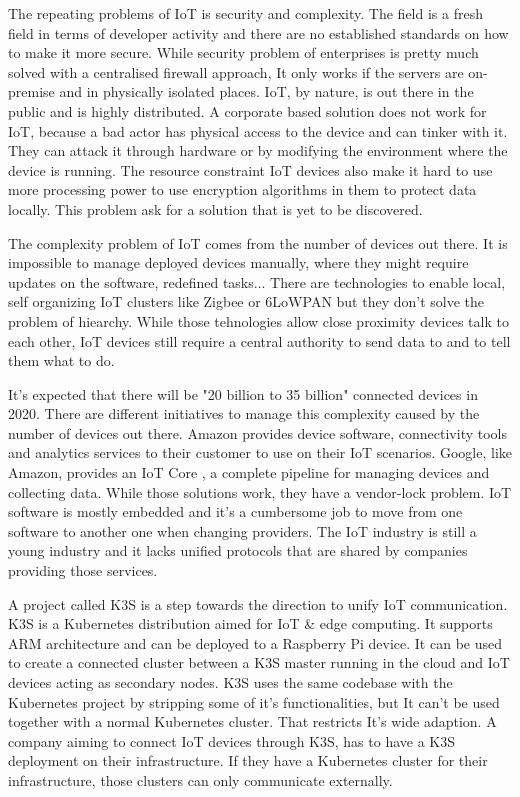 The repeating problems of IoT is security and complexity. The field is a fresh field in terms of developer activity and there are no established standards on how to make it more secure. While security problem of enterprises is pretty much solved with a centralised firewall approach, It only works if the servers are on-premise and in physically isolated places. IoT, by nature, is out there in the public and is highly distributed. A corporate based solution does not work for IoT, because a bad actor has physical access to the device and can tinker with it. They can attack it through hardware or by modifying the environment where the device is running. The resource constraint IoT devices also make it hard to use more processing power to use encryption algorithms in them to protect data locally. This problem ask for a solution that is yet to be discovered.

The complexity problem of IoT comes from the number of devices out there. It is impossible to manage deployed devices manually, where they might require updates on the software, redefined tasks... There are technologies to enable local, self organizing IoT clusters like Zigbee or 6LoWPAN but they don't solve the problem of hiearchy. While those tehnologies allow close proximity devices talk to each other, IoT devices still require a central authority to send data to and to tell them what to do.
\fi

It's expected that there will be "20 billion to 35 billion" \cite{unikernels-improve} connected devices in 2020. There are different initiatives to manage this complexity caused by the number of devices out there. Amazon provides device software, connectivity tools and analytics services to their customer to use on their IoT scenarios. Google, like Amazon, provides an IoT Core , a complete pipeline for managing devices and collecting data. While those solutions work, they have a vendor-lock problem. IoT software is mostly embedded and it's a cumbersome job to move from one software to another one when changing providers. The IoT industry is still a young industry and it lacks unified protocols that are shared by companies providing those services.

A project called K3S \cite{k3s} is a step towards the direction to unify IoT communication. K3S is a Kubernetes distribution aimed for IoT \& edge computing. It supports ARM architecture and can be deployed to a Raspberry Pi device. It can be used to create a connected cluster between a K3S master running in the cloud and IoT devices acting as secondary nodes. K3S uses the same codebase with the Kubernetes project by stripping some of it's functionalities, but It can't be used together with a normal Kubernetes cluster. That restricts It's wide adaption. A company aiming to connect IoT devices through K3S, has to have a K3S deployment on their infrastructure. If they have a Kubernetes cluster for their infrastructure, those clusters can only communicate externally.

